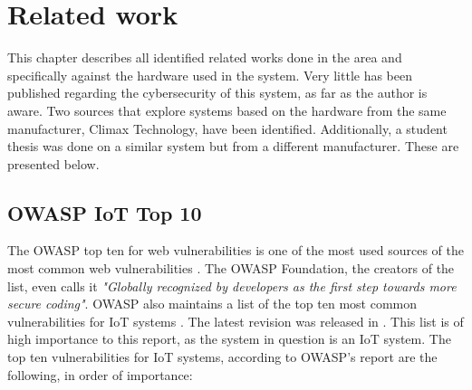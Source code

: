 \chapter{Related work} \label{ch:related-work}
This chapter describes all identified related works done in the area and specifically against the hardware used in the system. Very little has been published regarding the cybersecurity of this system, as far as the author is aware. Two sources that explore systems based on the hardware from the same manufacturer, Climax Technology, have been identified. Additionally, a student thesis was done on a similar system but from a different manufacturer. These are presented below.

\section{OWASP IoT Top 10}
The OWASP top ten for web vulnerabilities is one of the most used sources of the most common web vulnerabilities \cite{owasp-www-top10}. The OWASP Foundation, the creators of the list, even calls it \textit{"Globally recognized by developers as the first step towards more secure coding"}. OWASP also maintains a list of the top ten most common vulnerabilities for IoT systems \cite{owasp-iot-top10}. The latest revision was released in \citeyear{owasp-iot-top10}. This list is of high importance to this report, as the system in question is an IoT system. The top ten vulnerabilities for IoT systems, according to OWASP's report are the following, in order of importance:
